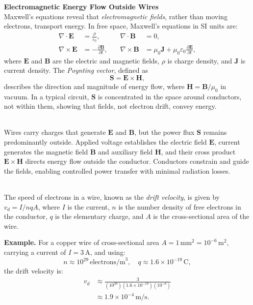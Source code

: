 \begin{technical}
{\Large\textbf{Electromagnetic Energy Flow Outside Wires}}\\[0.3em]

Maxwell’s equations reveal that \textit{electromagnetic fields}, rather than moving electrons, transport energy. In free space, Maxwell’s equations in SI units are:
\begin{align*}
\nabla \cdot \mathbf{E} &= \frac{\rho}{\varepsilon_0}, 
&\quad \nabla \cdot \mathbf{B} &= 0,\\
\nabla \times \mathbf{E} &= -\frac{\partial \mathbf{B}}{\partial t},
&\quad \nabla \times \mathbf{B} &= \mu_0 \mathbf{J} + \mu_0 \varepsilon_0 \frac{\partial \mathbf{E}}{\partial t},
\end{align*}
where $\mathbf{E}$ and $\mathbf{B}$ are the electric and magnetic fields, $\rho$ is charge density, and $\mathbf{J}$ is current density. The \textit{Poynting vector}, defined as
\[
\mathbf{S} = \mathbf{E} \times \mathbf{H},
\]
describes the direction and magnitude of energy flow, where $\mathbf{H} = \mathbf{B}/\mu_0$ in vacuum. In a typical circuit, $\mathbf{S}$ is concentrated in the space around conductors, not within them, showing that fields, not electron drift, convey energy.

\vspace{0.7em}
\\[0.5em]
Wires carry charges that generate $\mathbf{E}$ and $\mathbf{B}$, but the power flux $\mathbf{S}$ remains predominantly outside. Applied voltage establishes the electric field $\mathbf{E}$, current generates the magnetic field $\mathbf{B}$ and auxiliary field $\mathbf{H}$, and their cross product $\mathbf{E} \times \mathbf{H}$ directs energy flow outside the conductor. Conductors constrain and guide the fields, enabling controlled power transfer with minimal radiation losses.

\vspace{0.7em}
\\[0.5em]
The speed of electrons in a wire, known as the \textit{drift velocity}, is given by $v_d = I/n q A$, where $I$ is the current, $n$ is the number density of free electrons in the conductor, $q$ is the elementary charge, and $A$ is the cross-sectional area of the wire.

\noindent\textbf{Example.} For a copper wire of cross-sectional area $A = 1 \, \text{mm}^2 = 10^{-6} \, \text{m}^2$, carrying a current of $I = 3 \, \text{A}$, and using:
\[
n \approx 10^{29} \, \text{electrons/m}^3, \quad q \approx 1.6 \times 10^{-19} \, \text{C},
\]
the drift velocity is:
\begin{align*}
v_d &\approx \frac{3}{(10^{29})(1.6 \times 10^{-19})(10^{-6})}\\
 &\approx 1.9 \times 10^{-4} \, \text{m/s}.
\end{align*}


\end{technical}
